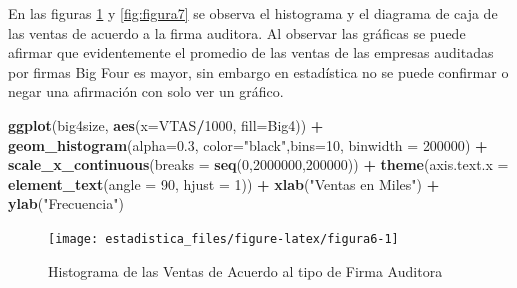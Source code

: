 \documentclass[]{book}
\newenvironment{Shaded}{\begin{snugshade}}{\end{snugshade}}
\newcommand{\DataTypeTok}[1]{\textcolor[rgb]{0.13,0.29,0.53}{#1}}
\newcommand{\DecValTok}[1]{\textcolor[rgb]{0.00,0.00,0.81}{#1}}
\newcommand{\FloatTok}[1]{\textcolor[rgb]{0.00,0.00,0.81}{#1}}
\newcommand{\KeywordTok}[1]{\textcolor[rgb]{0.13,0.29,0.53}{\textbf{#1}}}
\newcommand{\NormalTok}[1]{#1}
\newcommand{\OperatorTok}[1]{\textcolor[rgb]{0.81,0.36,0.00}{\textbf{#1}}}
\newcommand{\StringTok}[1]{\textcolor[rgb]{0.31,0.60,0.02}{#1}}
\begin{document}
\begin{Shaded}
\end{Shaded}

En las figuras \ref{fig:figura6} y \ref{fig:figura7} se observa el histograma y el diagrama de caja de las ventas de acuerdo a la firma auditora. Al observar las gráficas se puede afirmar que evidentemente el promedio de las ventas de las empresas auditadas por firmas Big Four es mayor, sin embargo en estadística no se puede confirmar o negar una afirmación con solo ver un gráfico.

\begin{Shaded}
\begin{Highlighting}[]
\KeywordTok{ggplot}\NormalTok{(big4size, }\KeywordTok{aes}\NormalTok{(}\DataTypeTok{x=}\NormalTok{VTAS}\OperatorTok{/}\DecValTok{1000}\NormalTok{, }\DataTypeTok{fill=}\NormalTok{Big4)) }\OperatorTok{+}\StringTok{ }
\StringTok{  }\KeywordTok{geom_histogram}\NormalTok{(}\DataTypeTok{alpha=}\FloatTok{0.3}\NormalTok{, }\DataTypeTok{color=}\StringTok{"black"}\NormalTok{,}\DataTypeTok{bins=}\DecValTok{10}\NormalTok{, }\DataTypeTok{binwidth =} \DecValTok{200000}\NormalTok{) }\OperatorTok{+}
\StringTok{  }\KeywordTok{scale_x_continuous}\NormalTok{(}\DataTypeTok{breaks =} \KeywordTok{seq}\NormalTok{(}\DecValTok{0}\NormalTok{,}\DecValTok{2000000}\NormalTok{,}\DecValTok{200000}\NormalTok{)) }\OperatorTok{+}
\StringTok{  }\KeywordTok{theme}\NormalTok{(}\DataTypeTok{axis.text.x =} \KeywordTok{element_text}\NormalTok{(}\DataTypeTok{angle =} \DecValTok{90}\NormalTok{, }\DataTypeTok{hjust =} \DecValTok{1}\NormalTok{)) }\OperatorTok{+}
\StringTok{  }\KeywordTok{xlab}\NormalTok{(}\StringTok{"Ventas en Miles"}\NormalTok{) }\OperatorTok{+}\StringTok{ }\KeywordTok{ylab}\NormalTok{(}\StringTok{"Frecuencia"}\NormalTok{) }
\end{Highlighting}
\end{Shaded}

\begin{figure}[h]

{\centering \texttt{[image: estadistica\_files/figure-latex/figura6-1]} 

}

\caption{Histograma de las Ventas de Acuerdo al tipo de Firma Auditora}\label{fig:figura6}
\end{figure}
\end{document}
